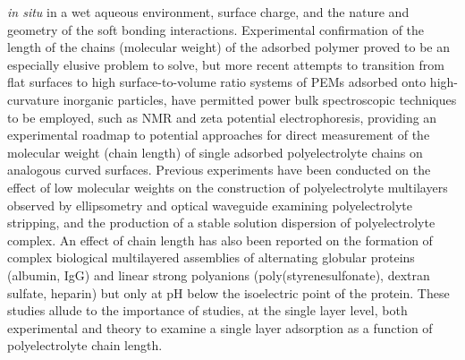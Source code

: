 \documentclass[journal=mamobx,manuscript=article]{achemso}
\begin{document}
\textit{in situ} in a wet aqueous environment, surface charge, and the nature and geometry of the soft bonding interactions.\cite{Smith2004,Tanchak2004,Harroun2005,Burke2005,Tanchak2006}   Experimental confirmation of the length of the chains (molecular weight) of the adsorbed polymer proved to be an especially elusive problem to solve, but more recent attempts to transition from flat surfaces to high surface-to-volume ratio systems of PEMs adsorbed onto high-curvature inorganic particles, have permitted power bulk spectroscopic techniques to be employed, such as NMR and zeta potential electrophoresis,\cite{Burke2003,Mermut2003,Smith2004,Smith2003} providing an experimental roadmap to potential approaches for direct measurement of the molecular weight (chain length) of single adsorbed polyelectrolyte chains on analogous curved surfaces.  Previous experiments have been conducted on the effect of low molecular weights on the construction of polyelectrolyte multilayers observed by ellipsometry and optical waveguide examining polyelectrolyte stripping, and the production of a stable solution dispersion of polyelectrolyte complex.\cite{Sui2003}  An effect of chain length has also been reported on the formation of complex biological multilayered assemblies of alternating globular proteins (albumin, IgG) and linear strong polyanions (poly(styrenesulfonate), dextran sulfate, heparin) but only at pH below the isoelectric point of the protein.\cite{Houska2004}  These studies allude to the importance of studies, at the single layer level, both experimental and theory to examine a single layer adsorption as a function of polyelectrolyte chain length.
\end{document}
